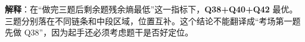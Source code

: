 \textbf{解释}：在“做完三题后剩余题残余熵最低”这一指标下，\textbf{Q38+Q40+Q42} 最优。三题分别落在不同链条和中段区域，位置互补。这个结论不能翻译成“考场第一题先做 Q38”，因为起手还必须考虑题干是否好定位。